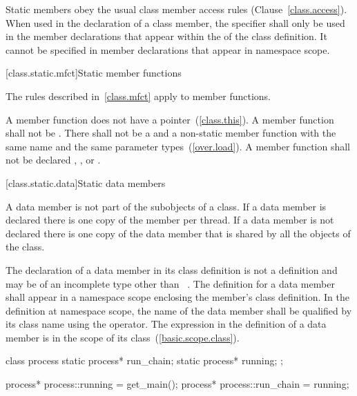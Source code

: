 \pnum
Static members obey the usual class member access rules
(Clause~\ref{class.access}). When used in the declaration of a class
member, the  specifier shall only be used in the member
declarations that appear within the  of
the class definition.
\enternote
It cannot be specified in member declarations that appear in namespace scope.
\exitnote

[class.static.mfct]{Static member functions}
%

\pnum
\enternote
The rules described in~\ref{class.mfct} apply to  member
functions.
\exitnote

\pnum
\enternote
A  member function does not have a 
pointer~(\ref{class.this}).
\exitnote
A  member function shall not be . There
shall not be a  and a non-static member function with the
same name and the same parameter types~(\ref{over.load}). A
 member function shall not be declared ,
, or .

[class.static.data]{Static data members}
%

\pnum
A  data member is not part of the subobjects of a class. If a
 data member is declared  there is one copy of
the member per thread. If a  data member is not declared
 there is one copy of the data member that is shared by all
the objects of the class.

\pnum
{}%
%
The declaration of a  data member in its class definition
is not a definition and may be of an incomplete type other than
\cv\ . The definition for a  data
member shall appear in a namespace scope enclosing the member's class
definition.
%
In the definition at namespace scope, the name of the 
data member shall be qualified by its class name using the \tcode{::}
operator. The  expression in the definition of a
 data member is in the scope of its
class~(\ref{basic.scope.class}).
%
\enterexample

\begin{codeblock}
class process {
  static process* run_chain;
  static process* running;
};

process* process::running = get_main();
process* process::run_chain = running;
\end{codeblock}

